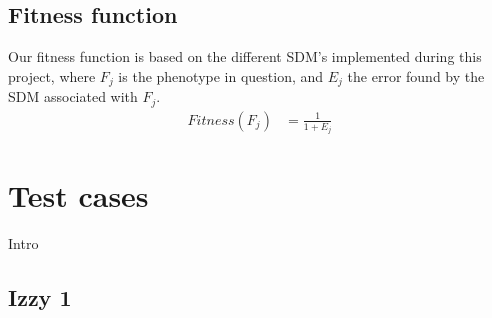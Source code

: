 \documentclass[12pt]{article}
\begin{document}
	\subsection{Fitness function}\label{sec:fitness}
		Our fitness function is based on the different SDM's implemented during this project, where $F_j$ is the phenotype in question, and $E_j$ the error found by the SDM associated with $F_j$.
		\begin{align}
			Fitness(F_j) &= \frac{1}{1+E_j}\nonumber
		\end{align}
\section{Test cases}\label{sec:test}
	Intro
	\subsection{Izzy 1}
\end{document}
